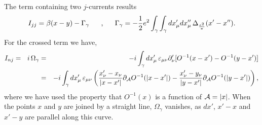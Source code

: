 \documentclass[a4paper,12pt]{article}
\begin{document}
The term containing two $j$-currents results
\begin{equation}
I_{jj}=\beta(x-y)- \Gamma_\gamma \makebox[.5in]{,}\Gamma_\gamma=-\frac{1}{2}e^2\int_\gamma \int_\gamma dx'_\mu dx''_\mu\, \Delta_{\frac{e^2}{\pi}}(x'-x'').
\label{jj}
\end{equation}
For the crossed term we have,
\begin{eqnarray}
I_{nj}=~~i\,\Omega_\gamma&=&-i\int_\gamma dx'_\mu\, \varepsilon_{\mu \nu}\partial_\nu' [O^{-1}(x-x')-O^{-1}(y-x')]\nonumber \\
&=&-i\int_\gamma dx'_\mu\, \varepsilon_{\mu \nu}\left(\frac{x'_\nu-x_\nu}{|x-x'|} \partial_{\cal A} O^{-1}(|x-x'|)-\frac{x'_\nu-y_\nu}{|y-x'|} \partial_{\cal A} O^{-1}(|y-x'|)\right),\nonumber \\
\label{crossed}
\end{eqnarray}
where we have used the property that $O^{-1}(x)$ is a function of ${\cal A}=|x|$.
When the points $x$ and $y$ are joined by a straight line, $\Omega_\gamma$ vanishes, as $dx'$, $x'-x$ and $x'-y$ are parallel along this curve.
\end{document}

